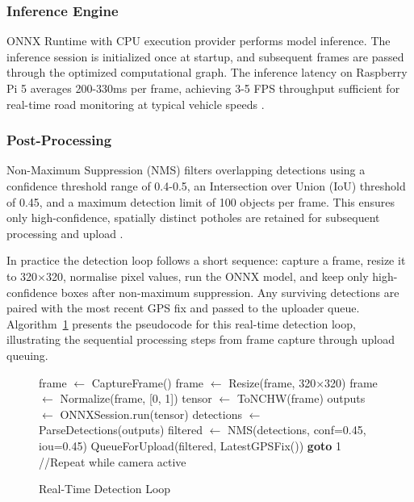 \documentclass{ieeeaccess}
\begin{document}
\subsubsection{Inference Engine}
ONNX Runtime with CPU execution provider performs model inference. The inference session is initialized once at startup, and subsequent frames are passed through the optimized computational graph. The inference latency on Raspberry Pi 5 averages 200-330ms per frame, achieving 3-5 FPS throughput sufficient for real-time road monitoring at typical vehicle speeds \cite{b7, b14}.

\subsubsection{Post-Processing}
Non-Maximum Suppression (NMS) filters overlapping detections using a confidence threshold range of 0.4-0.5, an Intersection over Union (IoU) threshold of 0.45, and a maximum detection limit of 100 objects per frame. This ensures only high-confidence, spatially distinct potholes are retained for subsequent processing and upload \cite{b6}.

In practice the detection loop follows a short sequence: capture a frame, resize it to 320$\times$320, normalise pixel values, run the ONNX model, and keep only high-confidence boxes after non-maximum suppression. Any surviving detections are paired with the most recent GPS fix and passed to the uploader queue. Algorithm~\ref{alg:detection_loop} presents the pseudocode for this real-time detection loop, illustrating the sequential processing steps from frame capture through upload queuing.

\begin{figure}[t]
\centering
\begin{algorithm}[H]
\caption{Real-Time Detection Loop}
\label{alg:detection_loop}
\begin{algorithmic}[1]
\State frame $\gets$ CaptureFrame()
\State frame $\gets$ Resize(frame, 320$\times$320)
\State frame $\gets$ Normalize(frame, [0, 1])
\State tensor $\gets$ ToNCHW(frame)
\State outputs $\gets$ ONNXSession.run(tensor)
\State detections $\gets$ ParseDetections(outputs)
\State filtered $\gets$ NMS(detections, conf=0.45, iou=0.45)
  \State QueueForUpload(filtered, LatestGPSFix())
\EndIf
\State \textbf{goto} 1 {      //Repeat while camera active}
\end{algorithmic}
\end{algorithm}
\end{figure}
\end{document}
